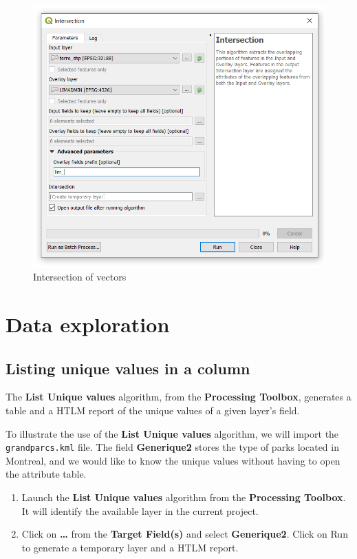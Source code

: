 \documentclass[]{book}
\theoremstyle{definition}
\theoremstyle{definition}
\theoremstyle{definition}
\theoremstyle{remark}
\begin{document}
\begin{figure}

{\centering \includegraphics[width=10.5in]{figures/Intersecting_Vectors_Dialog} 

}

\caption{Intersection of vectors}\label{fig:unnamed-chunk-21}
\end{figure}

\chapter{Data exploration}\label{data-exploration}

\section{Listing unique values in a
column}\label{listing-unique-values-in-a-column}

The \textbf{List Unique values} algorithm, from the \textbf{Processing
Toolbox}, generates a table and a HTLM report of the unique values of a
given layer's field.

To illustrate the use of the \textbf{List Unique values} algorithm, we
will import the \texttt{grandparcs.kml} file. The field
\textbf{Generique2} stores the type of parks located in Montreal, and we
would like to know the unique values without having to open the
attribute table.

\begin{enumerate}
\def\labelenumi{\arabic{enumi}.}
\item
  Launch the \textbf{List Unique values} algorithm from the
  \textbf{Processing Toolbox}. It will identify the available layer in
  the current project.
\item
  Click on \textbf{\ldots{}} from the \textbf{Target Field(s)} and
  select \textbf{Generique2}. Click on Run to generate a temporary layer
  and a HTLM report.
\end{enumerate}
\end{document}

